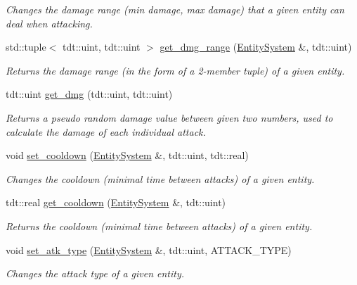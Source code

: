 \begin{DoxyCompactItemize}
\begin{DoxyCompactList}\small\item\em Changes the damage range (min damage, max damage) that a given entity can deal when attacking. \end{DoxyCompactList}\item 
std\+::tuple$<$ tdt\+::uint, tdt\+::uint $>$ \hyperlink{namespace_combat_helper_aea00cd6159c61ab16c28784da72d39f6}{get\+\_\+dmg\+\_\+range} (\hyperlink{class_entity_system}{Entity\+System} \&, tdt\+::uint)
\begin{DoxyCompactList}\small\item\em Returns the damage range (in the form of a 2-\/member tuple) of a given entity. \end{DoxyCompactList}\item 
tdt\+::uint \hyperlink{namespace_combat_helper_a1fe3e133a3167e4f775e9caf50565264}{get\+\_\+dmg} (tdt\+::uint, tdt\+::uint)
\begin{DoxyCompactList}\small\item\em Returns a pseudo random damage value between given two numbers, used to calculate the damage of each individual attack. \end{DoxyCompactList}\item 
void \hyperlink{namespace_combat_helper_a338a06e44f1e2690fc7a33e7a9a915ee}{set\+\_\+cooldown} (\hyperlink{class_entity_system}{Entity\+System} \&, tdt\+::uint, tdt\+::real)
\begin{DoxyCompactList}\small\item\em Changes the cooldown (minimal time between attacks) of a given entity. \end{DoxyCompactList}\item 
tdt\+::real \hyperlink{namespace_combat_helper_a198603bcd3cb2ad84e3dac976558d727}{get\+\_\+cooldown} (\hyperlink{class_entity_system}{Entity\+System} \&, tdt\+::uint)
\begin{DoxyCompactList}\small\item\em Returns the cooldown (minimal time between attacks) of a given entity. \end{DoxyCompactList}\item 
void \hyperlink{namespace_combat_helper_ae3c0e5787efffa106cc8828fe14a0ad7}{set\+\_\+atk\+\_\+type} (\hyperlink{class_entity_system}{Entity\+System} \&, tdt\+::uint, A\+T\+T\+A\+C\+K\+\_\+\+T\+Y\+PE)
\begin{DoxyCompactList}\small\item\em Changes the attack type of a given entity. \end{DoxyCompactList}\item 

\end{DoxyCompactItemize}
